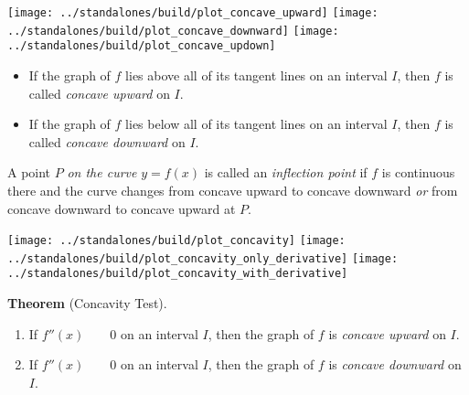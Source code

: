 \documentclass[../main.tex]{subfiles}
\begin{document}
\begin{center}
  \texttt{[image: ../standalones/build/plot\_concave\_upward]}
  \hfill
  \texttt{[image: ../standalones/build/plot\_concave\_downward]}
  \hfill
  \texttt{[image: ../standalones/build/plot\_concave\_updown]}
\end{center}
\bigskip

\begin{mdframed}[style=withref]
  \begin{itemize}
    \item If the graph of \(f\) lies {above} all of its tangent lines on an interval \(I\), then \(f\) is called \emph{concave upward} on \(I\). 
    \item If the graph of \(f\) lies {below} all of its tangent lines on an interval \(I\), then \(f\) is called \emph{concave downward} on \(I\).
  \end{itemize}

\end{mdframed}

A point \(P\) \emph{on the curve} \(y = f(x)\) is called an \emph{inflection point} if \(f\) is continuous there and the curve changes from concave upward to concave downward \emph{or} from concave downward to concave upward at \(P\).

\vspace{1in}

\begin{center}
  \texttt{[image: ../standalones/build/plot\_concavity]}
  \hfill
  \texttt{[image: ../standalones/build/plot\_concavity\_only\_derivative]}
  \hfill
  \texttt{[image: ../standalones/build/plot\_concavity\_with\_derivative]}
\end{center}

\begin{mdframed}[style=withref]
  \textbf{Theorem} (Concavity Test). 
  \begin{enumerate}[label=(\alph*)]
    \item If \(f''(x) \hspace{2em} 0\) on an interval \(I\), then the graph of \(f\) is \emph{concave upward} on \(I\).
    \item If \(f''(x) \hspace{2em} 0\) on an interval \(I\), then the graph of \(f\) is \emph{concave downward} on \(I\).
  \end{enumerate}

\end{mdframed}
\end{document}
